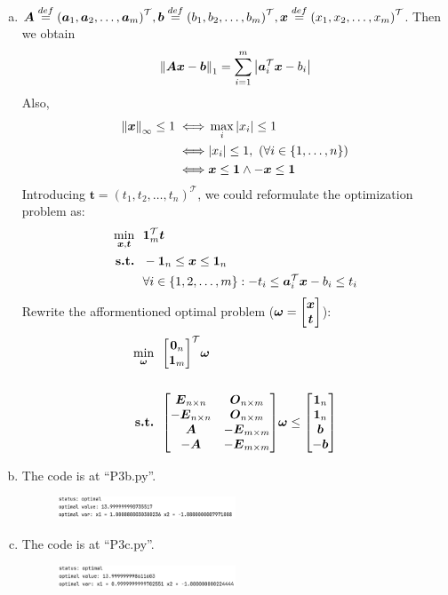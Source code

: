 \documentclass{article}
\def\bw{\boldsymbol{\omega}}
\def\ba{\boldsymbol{a}}
\def\bb{\boldsymbol{b}}
\def\bt{\boldsymbol{t}}
\def\bx{\boldsymbol{x}}
\def\bA{\boldsymbol{A}}
\def\bE{\boldsymbol{E}}
\def\bO{\boldsymbol{O}}
\begin{document}
\begin{enumerate}[(a)]
	\item 
		$\bA \stackrel{def}{=}
		\qty(\ba_1,\ba_2,\dots,\ba_m)^\mathcal{T},
		\bb \stackrel{def}{=}
		\qty(b_1,b_2,\dots,b_m)^{\mathcal{T}},
		\bx \stackrel{def}{=}
		\qty(x_1,x_2,\dots,x_m)^{\mathcal{T}}
		$.
		Then we obtain
		$$
		\norm{\bA\bx-\bb}_1
		=
		\sum_{i=1}^m\abs{\ba_i^\mathcal{T}\bx-b_i}
		$$
		Also, 
		$$
		\begin{aligned}
			\norm{\bx}_\infty\le1
			\iff
			&\max_i{\abs{x_i}}\le1
			\\
			\iff
			&\abs{x_i}\le1,\ (\forall i\in\qty{1,\dots,n})
			\\
			\iff
			&\bx\le\boldsymbol{1}\land-\bx\le\boldsymbol{1}
		\end{aligned}
		$$
		Introducing $\bt=(t_1,t_2,\dots,t_n)^{\mathcal{T}}$, we could reformulate the optimization problem as:
		$$
			\begin{aligned}
			\min_{\bx,\bt}\ \ 
			&\boldsymbol{1}_m^{\mathcal{T}}\bt
			\\
			\mbox{\textbf{s.t.}}\ \ 
			&-\boldsymbol{1}_n\le\bx\le\boldsymbol{1}_n
			\\
			&\forall i\in\qty{1,2,\dots,m}:
			-t_i\le\ba_i^{\mathcal{T}}\bx-b_i\le t_i
		\end{aligned}
		$$
		Rewrite the afformentioned optimal problem ($\bw=\mqty[\bx\\\bt]$):
		$$
			\begin{aligned}
				\min_{\bw}\ \ 
			&\mqty[\boldsymbol{0}_n \\ \boldsymbol{1}_m]^{\mathcal{T}}\bw
			\\
			\\
			\mbox{\textbf{s.t.}}\ \ 
			&
			\mqty[
				\bE_{n\times n} & \bO_{n\times m} \\
				-\bE_{n\times n} & \bO_{n\times m} \\
				\bA & -\bE_{m\times m} \\
				-\bA & -\bE_{m\times m} 
			]\bw
			\le
			\mqty[
				\boldsymbol{1}_n \\
				\boldsymbol{1}_n \\
				\bb \\
				-\bb
			]
		\end{aligned}
		$$
	\item
		The code is at ``P3b.py''.
		\begin{figure}[h]
		\centering
		\includegraphics[width=0.5\textwidth]{p3b.png}
		\end{figure}
	\newpage
	\item
		The code is at ``P3c.py''.
		\begin{figure}[h]
		\centering
		\includegraphics[width=0.5\textwidth]{p3c.png}
		\end{figure}
\end{enumerate}
\end{document}
